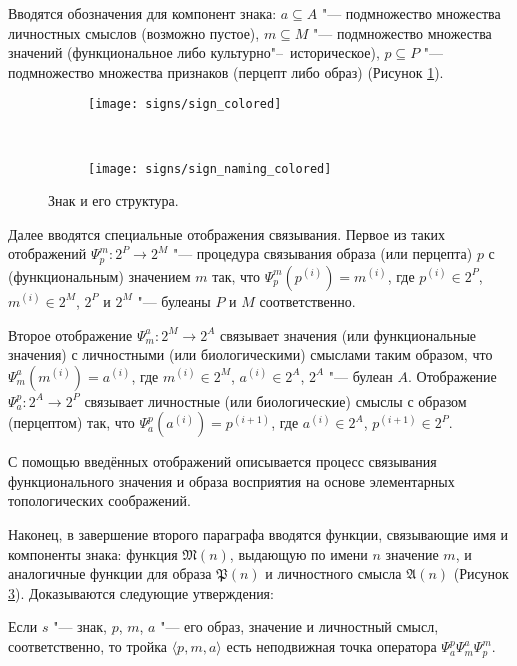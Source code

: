 Вводятся обозначения для компонент знака:  $a\subseteq A$ "--- подмножество множества личностных смыслов (возможно пустое), $m\subseteq M$ "--- подмножество множества значений (функциональное либо культурно"--~историческое), $p\subseteq P$ "--- подмножество множества признаков (перцепт либо образ) (Рисунок \ref{fg:sign}).
\begin{figure}[h]
	\centering
	\begin{subfigure}[b]{0.45\textwidth}
		\texttt{[image: signs/sign\_colored]}
		\caption{}
		\label{fg:sign}
	\end{subfigure}
	~
	\begin{subfigure}[b]{0.45\textwidth}
		\texttt{[image: signs/sign\_naming\_colored]}
		\caption{}
		\label{fg:sign_naming}
	\end{subfigure}
	\caption{Знак и его структура.}
\end{figure}

Далее вводятся специальные отображения связывания. Первое из таких отображений $\Psi_p^m:2^P\rightarrow 2^M$ "--- процедура связывания образа (или перцепта) $p$ с (функциональным) значением $m$ так, что $\Psi_p^m(p^{(i)})=m^{(i)}$, где $p^{(i)}\in 2^P$, $m^{(i)}\in 2^M$, $2^P$ и $2^M$ "--- булеаны $P$ и $M$ соответственно.

Второе отображение $\Psi_m^a:2^M\rightarrow 2^A$ связывает значения (или функциональные значения) с личностными (или биологическими) смыслами таким образом, что $\Psi_m^a(m^{(i)})=a^{(i)}$, где $m^{(i)}\in 2^M$, $a^{(i)}\in 2^A$, $2^A$ "--- булеан $A$. Отображение $\Psi_a^p:2^A\rightarrow 2^P$ связывает личностные (или биологические) смыслы с образом (перцептом) так, что $\Psi_a^p(a^{(i)})=p^{(i+1)}$, где $a^{(i)}\in 2^A$, $p^{(i+1)}\in 2^P$.

С помощью введённых отображений описывается процесс связывания функционального значения и образа восприятия на основе элементарных топологических соображений.

Наконец, в завершение второго параграфа вводятся функции, связывающие имя и компоненты знака: функция $\mathfrak M(n)$, выдающую по имени $n$ значение $m$, и аналогичные функции для образа $\mathfrak P(n)$ и личностного смысла $\mathfrak A(n)$ (Рисунок \ref{fg:sign_naming}). Доказываются следующие утверждения:

\begin{Pred}
	\label{pred:fixed_point}
	Если $s$ "--- знак, $p$, $m$, $a$ "--- его образ, значение и личностный смысл, соответственно, то тройка $\langle p,m,a\rangle$ есть неподвижная точка оператора $\Psi_a^p\Psi_m^a\Psi_p^m$.
\end{Pred}

